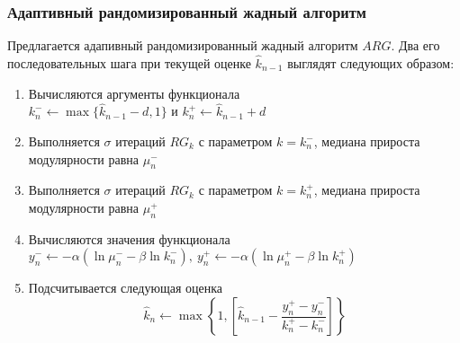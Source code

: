 \begin{frame}
	\frametitle{Адаптивный рандомизированный жадный алгоритм}

	Предлагается адапивный рандомизированный жадный алгоритм $ARG$. Два его последовательных шага при текущей оценке $\hat{k}_{n - 1}$ выглядят следующих образом:
	\begin{enumerate}
		\item Вычисляются аргументы функционала\\
		$k_{n}^{-} \leftarrow \max\{\hat{k}_{n - 1} - d, 1\}$ и $k_{n}^{+} \leftarrow \hat{k}_{n - 1} + d$
		\item Выполняется $\sigma$ итераций $RG_k$ с параметром $k = k_{n}^{-}$, медиана прироста модулярности равна $\mu_n^{-}$
		\item Выполняется $\sigma$ итераций $RG_k$ с параметром $k = k_{n}^{+}$, медиана прироста модулярности равна $\mu_n^{+}$
		\item Вычисляются значения функционала\\
		$y_n^{-} \leftarrow -\alpha (\ln \mu_n^{-} - \beta \ln k_n^{-}),\ y_n^{+} \leftarrow -\alpha (\ln \mu_n^{+} - \beta \ln k_n^{+})$
		\item Подсчитывается следующая оценка
		$$\hat{k}_n \leftarrow \max\left\{1, \left[\hat{k}_{n - 1} - \frac{y_n^{+} - y_n^{-}}{k_n^{+} - k_n^{-}}\right]\right\}$$
	\end{enumerate}
\end{frame}


